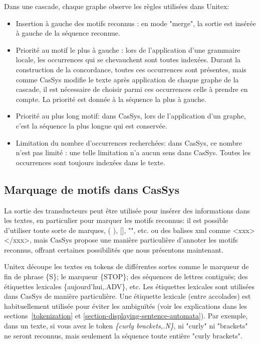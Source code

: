 Dans une cascade, chaque graphe observe les règles utilisées dans Unitex:
\begin{itemize}
	\item Insertion à gauche des motifs reconnus : en mode "merge", la sortie est insérée à
	gauche de la séquence reconnue.
	\item	Priorité au motif le plus à gauche : lors de l'application d'une grammaire locale,
	les occurrences qui se chevauchent sont toutes indexées. 
	Durant la construction de la concordance, toutes ces occurrences sont présentes, mais comme CasSys
	modifie le texte après application de chaque 
	graphe de la cascade, il est nécessaire de choisir parmi ces occurrences celle à prendre en
	compte. La priorité est donnée à la séquence la plus à gauche.
	\item Priorité au plus long motif: dans CasSys, lors de l'application d'un graphe, c'est la
	séquence la plus longue qui est conservée.
	\item	Limitation du nombre d'occurrences recherchées: dans CasSys, ce nombre n'est pas
	limité : une telle limitation n'a aucun sens dans CasSys. Toutes les occurrences sont
	toujours indexées dans le texte.
\end{itemize}

\subsection{Marquage de motifs dans CasSys}

La sortie des transducteurs peut être utilisée pour insérer des informations dans les textes, en
particulier pour marquer les motifs reconnus: il est possible d'utiliser toute sorte de marques, 
( ), [], "", etc. ou des balises xml comme <xxx> </xxx>, mais CasSys propose une manière
particulière d'annoter les motifs reconnus, offrant certaines possibilités que nous présentons
maintenant.  

\bigskip
\noindent Unitex découpe les textes en tokens de différentes sortes comme le marqueur de fin de
phrase \{S\}; le marqueur \{STOP\}; des séquences de lettres contiguës; des étiquettes lexicales
\{aujourd'hui,.ADV\}, etc. Les étiquettes lexicales sont utilisées dans CasSys de manière
particulière. Une étiquette lexicale (entre accolades) est habituellement utilisée pour éviter les
ambiguïtés (voir les explications dans les sections~\ref{tokenization} et 
\ref{section-displaying-sentence-automata}). 
Par exemple, dans un texte, si vous avez le token \emph{\{curly brackets,.N\}}, ni "curly" ni
"brackets" ne seront reconnus, mais seulement la séquence toute entière
"curly brackets". 

